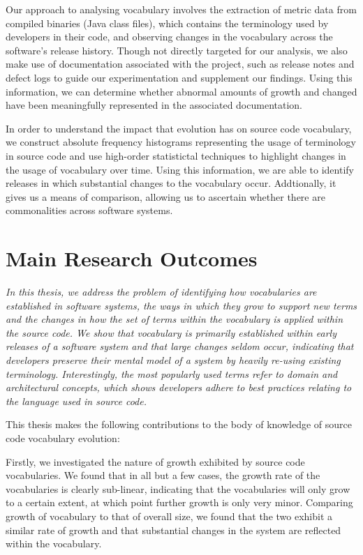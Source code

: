 Our approach to analysing vocabulary involves the extraction of metric data from compiled binaries (Java class files), which contains the terminology used by developers in their code, and observing changes in the vocabulary across the software's release history. Though not directly targeted for our analysis, we also make use of documentation associated with the project, such as release notes and defect logs to guide our experimentation and supplement our findings. Using this information, we can determine whether abnormal amounts of growth and changed have been meaningfully represented in the associated documentation.

In order to understand the impact that evolution has on source code vocabulary, we construct absolute frequency histograms representing the usage of terminology in source code and use high-order statistictal techniques to highlight changes in the usage of vocabulary over time. Using this information, we are able to identify releases in which substantial changes to the vocabulary occur. Addtionally, it gives us a means of comparison, allowing us to ascertain whether there are commonalities across software systems.


\section{Main Research Outcomes} %
\label{sec:main_research_outcomes}

\emph{In this thesis, we address the problem of identifying how vocabularies are established in software systems, the ways in which they grow to support new terms and the changes in how the set of terms within the vocabulary is applied within the source code. We show that vocabulary is primarily established within early releases of a software system and that large changes seldom occur, indicating that developers preserve their mental model of a system by heavily re-using existing terminology. Interestingly, the most popularly used terms refer to domain and architectural concepts, which shows developers adhere to best practices relating to the language used in source code.}

This thesis makes the following contributions to the body of knowledge of source code vocabulary evolution:

Firstly, we investigated the nature of growth exhibited by source code vocabularies. We found that in all but a few cases, the growth rate of the vocabularies is clearly sub-linear, indicating that the vocabularies will only grow to a certain extent, at which point further growth is only very minor. Comparing growth of vocabulary to that of overall size, we found that the two exhibit a similar rate of growth and that substantial changes in the system are reflected within the vocabulary.

